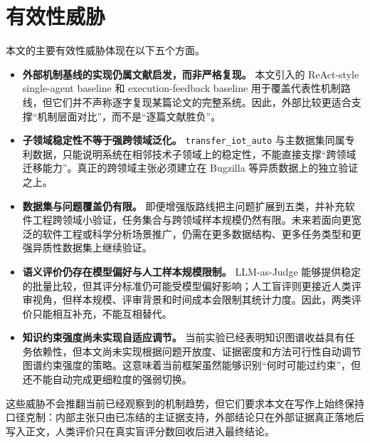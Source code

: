 \section{有效性威胁}

本文的主要有效性威胁体现在以下五个方面。

\begin{itemize}
  \item \textbf{外部机制基线的实现仍属文献启发，而非严格复现。} 本文引入的 ReAct-style single-agent baseline 和 execution-feedback baseline 用于覆盖代表性机制路线，但它们并不声称逐字复现某篇论文的完整系统。因此，外部比较更适合支撑“机制层面对比”，而不是“逐篇文献胜负”。
  \item \textbf{子领域稳定性不等于强跨领域泛化。} \texttt{transfer\_iot\_auto} 与主数据集同属专利数据，只能说明系统在相邻技术子领域上的稳定性，不能直接支撑“跨领域迁移能力”。真正的跨领域主张必须建立在 Bugzilla 等异质数据上的独立验证之上。
  \item \textbf{数据集与问题覆盖仍有限。} 即便增强版路线把主问题扩展到五类，并补充软件工程跨领域小验证，任务集合与跨领域样本规模仍然有限。未来若面向更宽泛的软件工程或科学分析场景推广，仍需在更多数据结构、更多任务类型和更强异质性数据集上继续验证。
  \item \textbf{语义评价仍存在模型偏好与人工样本规模限制。} LLM-as-Judge 能够提供稳定的批量比较，但其评分标准仍可能受模型偏好影响\citep{zheng2023judging,ji2023survey}；人工盲评则更接近人类评审视角，但样本规模、评审背景和时间成本会限制其统计力度。因此，两类评价只能相互补充，不能互相替代。
  \item \textbf{知识约束强度尚未实现自适应调节。} 当前实验已经表明知识图谱收益具有任务依赖性，但本文尚未实现根据问题开放度、证据密度和方法可行性自动调节图谱约束强度的策略。这意味着当前框架虽然能够识别“何时可能过约束”，但还不能自动完成更细粒度的强弱切换。
\end{itemize}


这些威胁不会推翻当前已经观察到的机制趋势，但它们要求本文在写作上始终保持口径克制：内部主张只由已冻结的主证据支持，外部结论只在外部证据真正落地后写入正文，人类评价只在真实盲评分数回收后进入最终结论。
